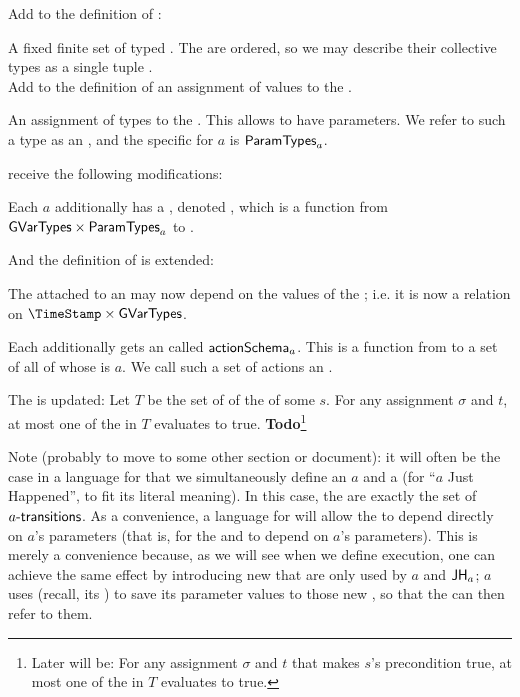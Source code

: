 \documentclass[12pt]{article}
\begin{document}
Add to the definition of \Contract:
\begin{LPPI}
\item A fixed finite set of typed \GVars. The \GVars are ordered, so we may describe their collective types as a single tuple \GVarTypes. \\
 Add to the definition of \GlobalState an assignment of values to the \GVars.

\item An assignment of types to the \Actions. This allows \Events to have parameters. We refer to such a type as an \AParamsDomain, and the specific \AParamsDomain for \Action $a$ is $\textsf{ParamTypes}_{a}$.
\end{LPPI}

\noindent \Events receive the following modifications:
\begin{LPPI}
\item Each \Action $a$ additionally has a \GStateTransform, denoted , which is a function from $\text{{\sf GVarTypes}} \times \textsf{ParamTypes}_{a}$ to \GVarTypes. 
\item And the definition of  is extended:
\begin{LPPI}
\item The \TGuard attached to an  may now depend on the values of the \GVars; i.e. it is now a relation on $\TimeStamp \times \text{\GVarTypes}$.
\item Each  additionally gets an \ASConstructor called $\textsf{actionSchema}_{a}$. This is a function from \GVarTypes to a set of \Events all of whose \Action is $a$. We call such a set of actions an  \ActionSchema. 
\end{LPPI}
\end{LPPI}

\noindent The \uaoc is updated: Let $T$ be the set of \TGuards of the \mustntrans of some \State $s$. For any \GVars assignment $\sigma$ and \TimeStamp $t$, at most one of the \TGuards in $T$ evaluates to true. {\bf Todo}\footnote{Later will be: For any \GVars assignment $\sigma$ and \TimeStamp $t$ that makes $s$'s precondition true, at most one of the \TGuards in $T$ evaluates to true.}


\bigskip

Note (probably to move to some other section or document): it will often be the case in a language for \Contracts that we simultaneously define an \Action $a$ and a \State {} (for ``$a$ Just Happened'', to fit its literal meaning). In this case, the  are exactly the set of $a\textsf{-transitions}$. As a convenience, a language for \Contracts will allow the  to depend directly on $a$'s parameters (that is, for the \TGuard and \ASConstructor to depend on $a$'s parameters). This is merely a convenience because, as we will see when we define execution, one can achieve the same effect by introducing new \GVars that are only used by $a$ and $\textsf{JH}_{a}$; $a$ uses  (recall, its \GStateTransform) to save its parameter values to those new \GVars, so that the  can then refer to them.
\end{document}
